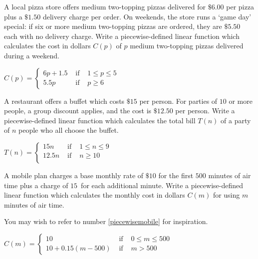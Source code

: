 \documentclass{ximera}
\begin{document}
\begin{problem}
A local pizza store offers medium two-topping pizzas delivered for $\$6.00$ per pizza plus a $\$1.50$ delivery charge per order.  On weekends, the store runs a `game day' special:  if six or more medium two-topping pizzas are ordered, they are $\$5.50$ each with no delivery charge.  Write a piecewise-defined linear function which calculates the cost in dollars $C(p)$ of  $p$ medium two-topping pizzas delivered during a weekend.

\begin{solution}
$C(p) = \left\{ \begin{array}{rcl} 6p + 1.5 & \mbox{ if } & 1 \leq p \leq 5 \\
5.5p & \mbox{ if } & p\geq 6
\end{array} \right.$
\end{solution}
\end{problem}

\begin{problem}
A restaurant offers a buffet which costs $\$15$ per person.  For parties of $10$ or more people, a group discount applies, and the cost is $\$12.50$ per person.   Write a piecewise-defined linear function which calculates the total bill $T(n)$ of a party of $n$ people who all choose the buffet.

\begin{solution}
$T(n) = \left\{ \begin{array}{rcl} 15n & \mbox{ if } & 1 \leq n \leq 9 \\
12.5n & \mbox{ if } & n \geq 10 \\
\end{array} \right.$

\end{solution}
\end{problem}

\begin{problem}
A mobile plan charges a base monthly rate of $\$10$ for the first $500$ minutes of air time plus a charge of $15$\textcent \, for each additional minute.  Write a piecewise-defined linear function which calculates the monthly cost in dollars  $C(m)$  for using $m$ minutes of air time.

\begin{hint}
You may wish to refer to number \ref{piecewisemobile} for inspiration.
\end{hint}

\begin{solution}
$C(m) = \left\{ \begin{array}{rcl} 10 & \mbox{ if } & 0 \leq m \leq 500 \\
10+0.15(m-500) & \mbox{ if } & m > 500
\end{array} \right.$
\end{solution}
\end{problem}
 
\end{document}
